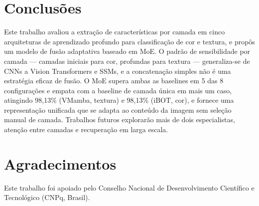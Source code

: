\documentclass[conference]{IEEEtran}
\begin{document}
\section{Conclus\~{o}es}

Este trabalho avaliou a extra\c{c}\~{a}o de caracter\'{i}sticas por
camada em cinco arquiteturas de aprendizado profundo para classifica\c{c}\~{a}o
de cor e textura, e propôs um modelo de fus\~{a}o adaptativa baseado em MoE.
O padr\~{a}o de sensibilidade por camada --- camadas iniciais para cor,
profundas para textura --- generaliza-se de CNNs a Vision Transformers e
SSMs, e a concatena\c{c}\~{a}o simples n\~{a}o \'{e} uma estrat\'{e}gia
eficaz de fus\~{a}o.
O MoE supera ambas as baselines em 5 das 8 configura\c{c}\~{o}es e empata
com a baseline de camada \'{u}nica em mais um caso, atingindo 98,13\%
(VMamba, textura) e 98,13\% (iBOT, cor), e fornece uma representa\c{c}\~{a}o
unificada que se adapta ao conte\'{u}do da imagem sem sele\c{c}\~{a}o
manual de camada.
Trabalhos futuros explorar\~{a}o mais de dois especialistas, aten\c{c}\~{a}o
entre camadas e recupera\c{c}\~{a}o em larga escala.

\section*{Agradecimentos}

Este trabalho foi apoiado pelo Conselho Nacional de Desenvolvimento
Cient\'{i}fico e Tecnol\'{o}gico (CNPq, Brasil).
\end{document}

